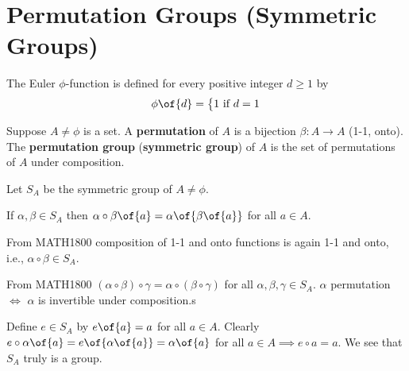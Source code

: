 \chapter{Permutation Groups (Symmetric Groups)}


\begin{definition}
    The Euler $\phi$-function is defined for every positive integer $d \geq 1$ by
    \[\phi\of{d} = \left\{ \begin{matrix} 1 \text{ if } d = 1 \\ \end{matrix} \right.\]
\end{definition}

\begin{definition}
    Suppose $A \neq \phi$ is a set. A \textbf{permutation} of $A$ is a bijection $\beta: A \to A$ (1-1, onto). The \textbf{permutation group} (\textbf{symmetric group}) of $A$ is the set of permutations of $A$ under composition.
\end{definition}

\begin{recall}
    Let $S_A$ be the symmetric group of $A \neq \phi$.

    If $\alpha, \beta \in S_A$ then $\alpha \circ \beta \of{a} = \alpha\of{\beta\of{a}}$ for all $a \in A$.

    From MATH1800 composition of 1-1 and onto functions is again 1-1 and onto, i.e., $\alpha \circ \beta \in S_A$.

    From MATH1800 $(\alpha \circ \beta) \circ \gamma = \alpha \circ (\beta \circ \gamma)$ for all $\alpha, \beta, \gamma \in S_A$.
    $\alpha$ permutation $\iff$ $\alpha$ is invertible under composition.s
\end{recall}

\begin{remark}
    Define $e \in S_A$ by $e\of{a} = a$ for all $a \in A$. Clearly $e \circ \alpha \of{a} = e\of{\alpha\of{a}} = \alpha\of{a}$ for all $a \in A \implies e \circ a = a$.
    We see that $S_A$ truly is a group.
\end{remark}


